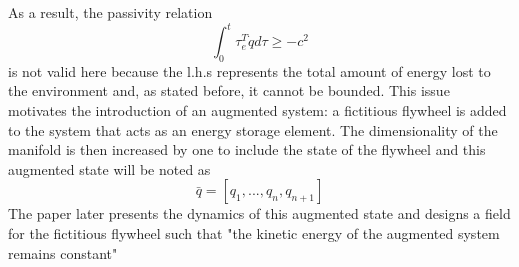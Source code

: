 As a result, the passivity relation 
\begin{equation}
    \int_{0}^{t}\tau_{e}^T \dot{q}d\tau \geq -c^2 
\end{equation}
is not valid here because the l.h.s represents the total amount of energy lost to the environment and, as stated before, it cannot be bounded. 
This issue motivates the introduction of an augmented system: a fictitious flywheel is added to the system that acts as an energy storage element.
The dimensionality of the manifold is then increased by one to include the state of the flywheel and this augmented state will be noted as
\begin{equation} 
    \bar{q}=[q_1,...,q_n,q_{n+1}]
\end{equation}
The paper later presents the dynamics of this augmented state and designs a field for the fictitious flywheel such that "the kinetic energy of the augmented system remains constant"